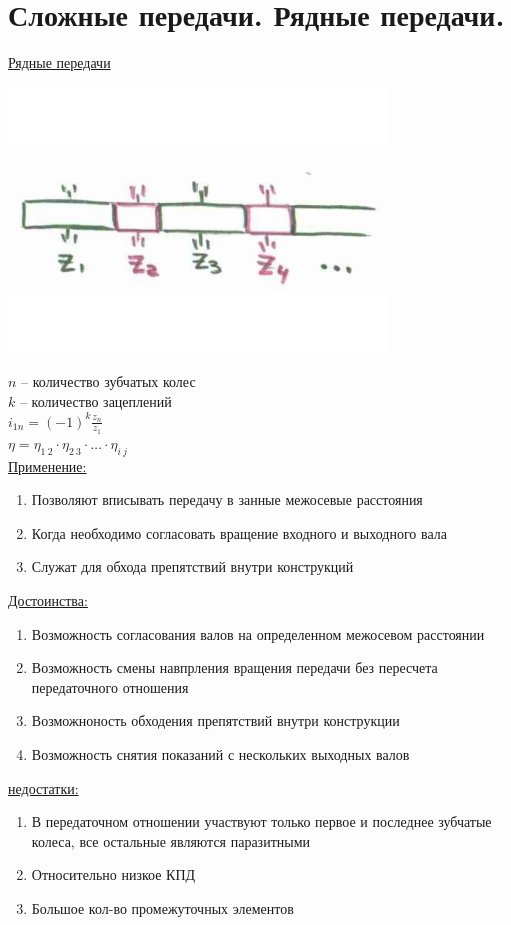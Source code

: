 \documentclass{article}
\begin{document}
\section {Сложные передачи. Рядные передачи.}

\underline{Рядные передачи}

\includegraphics[width = 0.75\textwidth]{17_1}

$n$ -- количество зубчатых колес\\
$k$ -- количество зацеплений\\
$i_{1n} = (-1)^k \frac{z_n}{z_1}$\\
$\eta = \eta_{1\:2}\cdot\eta_{2\:3}\cdot\dots\cdot\eta_{i\:j}$\\
\underline{Применение:}
\begin{enumerate}
	\item Позволяют вписывать передачу в занные межосевые расстояния
	\item Когда необходимо согласовать вращение входного и выходного вала
	\item Служат для обхода препятствий внутри конструкций
\end{enumerate}
\underline{Достоинства:} 
\begin{enumerate}
	\item Возможность согласования валов на определенном межосевом расстоянии
	\item Возможность смены навпрления вращения передачи без пересчета передаточного отношения
	\item Возможноность обходения препятствий внутри конструкции
	\item Возможность снятия показаний с нескольких выходных валов
\end{enumerate}
\underline{недостатки:} 
\begin{enumerate}
	\item В передаточном отношении участвуют только первое и последнее зубчатые колеса, все остальные являются паразитными
	\item Относительно низкое КПД
	\item Большое кол-во промежуточных элементов
\end{enumerate}
\end{document}
